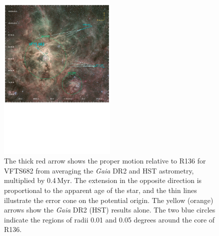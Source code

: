 \documentclass[a4paper,fleqn,usenatbib]{mnras}
\begin{document}

\begin{figure}%
  \centering
  \includegraphics[width=0.5\textwidth]{./figures/fig2}  
  \caption{The thick red arrow shows the proper motion
    relative to R136 for VFTS682 from averaging the \emph{Gaia} DR2 and HST
  astrometry, multiplied by 0.4\,Myr. The extension in the opposite
  direction is proportional to the apparent age of the star, and the
  thin lines illustrate the error cone on the potential origin. The
  yellow (orange) arrows show the \emph{Gaia} DR2 (HST) results alone. The two blue circles indicate the regions of radii 0.01 and 0.05
  degrees around the core of R136.}
\vspace{-5pt}
  \label{fig:main}
\end{figure}
\end{document}
